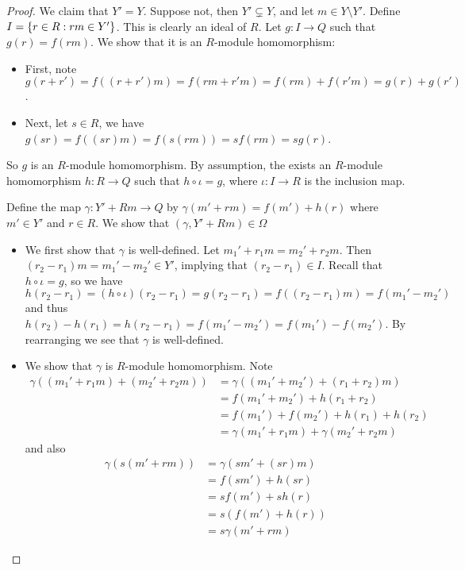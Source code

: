 \begin{proof}
    We claim that $Y' = Y$. Suppose not, then $Y'\subsetneq Y$, and let $m\in Y\setminus Y'$. Define $I = \left\{r\in R:rm\in Y'\right\}$. This is clearly an ideal of $R$. Let $g:I\to Q$ such that $g(r) = f(rm)$. We show that it is an $R$-module homomorphism:
    \begin{itemize}
        \item First, note $g(r+ r') = f((r+r')m) = f(rm + r'm) = f(rm) + f(r'm) = g(r) + g(r')$.
        \item Next, let $s\in R$, we have $g(sr) = f((sr)m) = f(s(rm)) = sf(rm) = sg(r)$.
    \end{itemize}
    So $g$ is an $R$-module homomorphism. By assumption, the exists an $R$-module homomorphism $h:R\to Q$ such that $h\circ \iota = g$, where $\iota:I\to R$ is the inclusion map.

    Define the map $\gamma:Y' + Rm \to Q$ by $\gamma(m'+rm) = f(m') + h(r)$ where $m'\in Y'$ and $r\in R$. We show that $(\gamma, Y' + Rm)\in \Omega$
    \begin{itemize}
        \item We first show that $\gamma$ is well-defined. Let $m_1' + r_1 m = m_2' + r_2 m$. Then $(r_2-r_1) m = m_1' - m_2' \in Y'$, implying that $(r_2-r_1)\in I$. Recall that $h\circ \iota = g$, so we have
        \[h(r_2-r_1) = (h\circ \iota) (r_2 - r_1) = g(r_2-r_1) = f((r_2-r_1)m) = f(m_1'-m_2')\]
        and thus $h(r_2)-h(r_1) = h(r_2-r_1) = f(m_1'-m_2') = f(m_1')-f(m_2')$. By rearranging we see that $\gamma$ is well-defined.
        \item We show that $\gamma$ is $R$-module homomorphism. Note
        \begin{align*}
            \gamma((m_1' + r_1 m) + (m_2' + r_2m))
            &= \gamma((m_1' + m_2') + (r_1 + r_2)m)\\
            &= f(m_1' + m_2') + h(r_1 + r_2)\\
            &= f(m_1') + f(m_2') + h(r_1) + h(r_2)\\
            &= \gamma(m_1' + r_1 m) + \gamma(m_2' + r_2m)
        \end{align*}
        and also 
        \begin{align*}
            \gamma(s(m' + rm))
            &= \gamma(sm' + (sr)m)\\
            &= f(sm') + h(sr)\\
            &= s f(m') + s h(r) \\
            &= s(f(m') + h(r))\\
            &= s \gamma(m' + rm)

\end{align*}
\end{itemize}
\end{proof}
